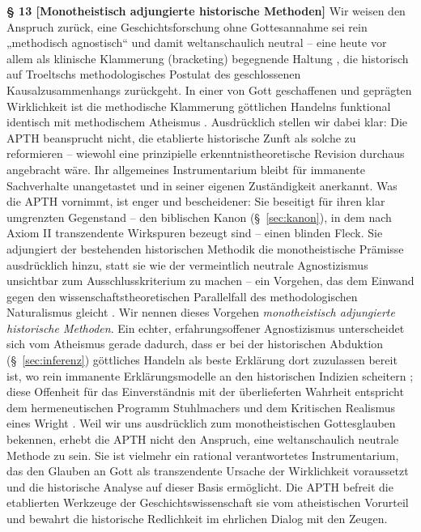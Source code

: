 \documentclass[11pt,a4paper]{article}
\makeatletter
\newcommand{\apth}{{\apthfont APTH}\hspace{0.15em}\xspace}
\newcommand{\apthsec}[3]{%
  \phantomsection%
  \def\@currentlabel{#1}%
  \label{sec:#3}%
  \textbf{§ #1 [#2]}%
}
\makeatother
\begin{document}
\apthsec{13}{Monotheistisch adjungierte historische Methoden}{adjungierung} Wir weisen den Anspruch zurück, eine Geschichtsforschung ohne Gottesannahme sei rein „methodisch agnostisch“ und damit weltanschaulich neutral – eine heute vor allem als klinische Klammerung (bracketing) begegnende Haltung \citep{meier1991}, die historisch auf Troeltschs \citeyearpar{troeltsch1913} methodologisches Postulat des geschlossenen Kausalzusammenhangs zurückgeht. In einer von Gott geschaffenen und geprägten Wirklichkeit ist die methodische Klammerung göttlichen Handelns funktional identisch mit methodischem Atheismus \citep{schlatter1905,pannenberg1961,maier1974,linnemann1999}. Ausdrücklich stellen wir dabei klar: Die \apth beansprucht nicht, die etablierte historische Zunft als solche zu reformieren – wiewohl eine prinzipielle erkenntnistheoretische Revision durchaus angebracht wäre. Ihr allgemeines Instrumentarium bleibt für immanente Sachverhalte unangetastet und in seiner eigenen Zuständigkeit anerkannt. Was die \apth vornimmt, ist enger und bescheidener: Sie beseitigt für ihren klar umgrenzten Gegenstand – den biblischen Kanon (§~\ref{sec:kanon}), in dem nach Axiom II transzendente Wirkspuren bezeugt sind – einen blinden Fleck. Sie adjungiert der bestehenden historischen Methodik die monotheistische Prämisse ausdrücklich hinzu, statt sie wie der vermeintlich neutrale Agnostizismus unsichtbar zum Ausschlusskriterium zu machen – ein Vorgehen, das dem Einwand gegen den wissenschaftstheoretischen Parallelfall des methodologischen Naturalismus gleicht \citep{plantinga2011}. Wir nennen dieses Vorgehen \textit{monotheistisch adjungierte historische Methoden}. Ein echter, erfahrungsoffener Agnostizismus unterscheidet sich vom Atheismus gerade dadurch, dass er bei der historischen Abduktion (§~\ref{sec:inferenz}) göttliches Handeln als beste Erklärung dort zuzulassen bereit ist, wo rein immanente Erklärungsmodelle an den historischen Indizien scheitern \citep{keener2011,licona2010,wright2003}; diese Offenheit für das Einverständnis mit der überlieferten Wahrheit entspricht dem hermeneutischen Programm Stuhlmachers \citep{stuhlmacher1979,stuhlmacher1989} und dem Kritischen Realismus eines Wright \citep{wright1992}. Weil wir uns ausdrücklich zum monotheistischen Gottesglauben bekennen, erhebt die \apth nicht den Anspruch, eine weltanschaulich neutrale Methode zu sein. Sie ist vielmehr ein rational verantwortetes Instrumentarium, das den Glauben an Gott als transzendente Ursache der Wirklichkeit voraussetzt und die historische Analyse auf dieser Basis ermöglicht. Die \apth befreit die etablierten Werkzeuge der Geschichtswissenschaft sie vom atheistischen Vorurteil und bewahrt die historische Redlichkeit im ehrlichen Dialog mit den Zeugen.
\end{document}
